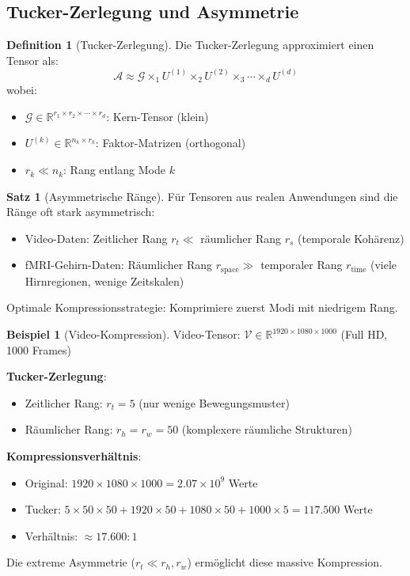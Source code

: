 \documentclass[a4paper,12pt]{report}
\theoremstyle{definition}
\newtheorem{definition}{Definition}
\newtheorem{beispiel}{Beispiel}
\newtheorem{satz}{Satz}
\begin{document}
	\subsection{Tucker-Zerlegung und Asymmetrie}
	
	\begin{definition}[Tucker-Zerlegung]
		Die Tucker-Zerlegung approximiert einen Tensor als:
		\[
		\mathcal{A} \approx \mathcal{G} \times_1 U^{(1)} \times_2 U^{(2)} \times_3 \cdots \times_d U^{(d)}
		\]
		wobei:
		\begin{itemize}
			\item $\mathcal{G} \in \mathbb{R}^{r_1 \times r_2 \times \cdots \times r_d}$: Kern-Tensor (klein)
			\item $U^{(k)} \in \mathbb{R}^{n_k \times r_k}$: Faktor-Matrizen (orthogonal)
			\item $r_k \ll n_k$: Rang entlang Mode $k$
		\end{itemize}
	\end{definition}
	
	\begin{satz}[Asymmetrische Ränge]
		Für Tensoren aus realen Anwendungen sind die Ränge oft stark asymmetrisch:
		\begin{itemize}
			\item Video-Daten: Zeitlicher Rang $r_t \ll$ räumlicher Rang $r_s$ (temporale Kohärenz)
			\item fMRI-Gehirn-Daten: Räumlicher Rang $r_{\text{space}} \gg$ temporaler Rang $r_{\text{time}}$ (viele Hirnregionen, wenige Zeitskalen)
		\end{itemize}
		
		Optimale Kompressionsstrategie: Komprimiere zuerst Modi mit niedrigem Rang.
	\end{satz}
	
	\begin{beispiel}[Video-Kompression]
		Video-Tensor: $\mathcal{V} \in \mathbb{R}^{1920 \times 1080 \times 1000}$ (Full HD, 1000 Frames)
		
		\textbf{Tucker-Zerlegung}:
		\begin{itemize}
			\item Zeitlicher Rang: $r_t = 5$ (nur wenige Bewegungsmuster)
			\item Räumlicher Rang: $r_h = r_w = 50$ (komplexere räumliche Strukturen)
		\end{itemize}
		
		\textbf{Kompressionsverhältnis}:
		\begin{itemize}
			\item Original: $1920 \times 1080 \times 1000 = 2.07 \times 10^9$ Werte
			\item Tucker: $5 \times 50 \times 50 + 1920 \times 50 + 1080 \times 50 + 1000 \times 5 = 117.500$ Werte
			\item Verhältnis: $\approx 17.600:1$
		\end{itemize}
		
		Die extreme Asymmetrie ($r_t \ll r_h, r_w$) ermöglicht diese massive Kompression.
	\end{beispiel}
	
\end{document}
